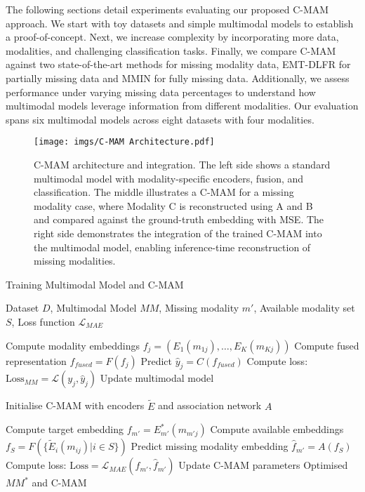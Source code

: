 The following sections detail experiments evaluating our proposed C-MAM approach. We start with toy datasets and simple multimodal models to establish a proof-of-concept. Next, we increase complexity by incorporating more data, modalities, and challenging classification tasks. Finally, we compare C-MAM against two state-of-the-art methods for missing modality data, EMT-DLFR for partially missing data and MMIN for fully missing data. Additionally, we assess performance under varying missing data percentages to understand how multimodal models leverage information from different modalities. Our evaluation spans six multimodal models across eight datasets with four modalities.
\begin{figure}[ht!]
    \centering
    \texttt{[image: imgs/C-MAM Architecture.pdf]}
    \caption{C-MAM architecture and integration. The left side shows a standard multimodal model with modality-specific encoders, fusion, and classification. The middle illustrates a C-MAM for a missing modality case, where Modality C is reconstructed using A and B and compared against the ground-truth embedding with MSE. The right side demonstrates the integration of the trained C-MAM into the multimodal model, enabling inference-time reconstruction of missing modalities.}
    \label{fig:ACM_TOMM_MM_CMAM_ARCH}
\end{figure}
\begin{algorithm}[ht!]
    \small
\caption{Training Multimodal Model and C-MAM}
\label{alg:cmam_training}
\begin{algorithmic}[1]
\REQUIRE Dataset $D$, Multimodal Model $MM$, Missing modality $m'$, Available modality set $S$, Loss function $\mathcal{L}_{MAE}$

\STATE Compute modality embeddings $f_j = (E_1(m_{1j}), \dots, E_K(m_{Kj}))$
\STATE Compute fused representation $f_{fused} = F(f_j)$
\STATE Predict $\hat{y}_j = C(f_{fused})$
\STATE Compute loss: $\text{Loss}_{MM} = \mathcal{L}(y_j, \hat{y}_j)$
\STATE Update multimodal model
\ENDFOR
\ENDFOR

\STATE Initialise C-MAM with encoders $\tilde{E}$ and association network $A$

\STATE Compute target embedding $f_{m'} = E_{m'}^*(m_{m'j})$
\STATE Compute available embeddings $f_S = F(\{\tilde{E}_i(m_{ij}) | i \in S\})$
\STATE Predict missing modality embedding $\hat{f}_{m'} = A(f_S)$
\STATE Compute loss: $\text{Loss} = \mathcal{L}_{MAE}(f_{m'}, \hat{f}_{m'})$
\STATE Update C-MAM parameters
\ENDFOR
\ENDFOR
\RETURN Optimised $MM^*$ and C-MAM
\end{algorithmic}
\end{algorithm}
